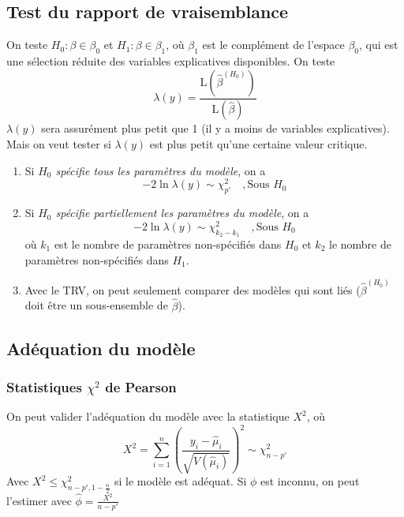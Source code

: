 \documentclass[10pt, french]{article}
\begin{document}
\begin{multicols*}{3}
\subsection*{Test du rapport de vraisemblance}
On teste $H_0 : \beta \in \beta_0$ et $H_1 : \beta \in \beta_1$, où $\beta_1$ est le complément de l'espace $\beta_0$, qui est une sélection réduite des variables explicatives disponibles. On teste
\[\lambda(y) = \frac{\mathrm{L}\left(\hat{\beta}^{(H_0)} \right)}{\mathrm{L}(\hat{\beta})}   \]
$\lambda(y)$ sera assurément plus petit que 1 (il y a moins de variables explicatives). Mais on veut tester si $\lambda(y)$ est plus petit qu'une certaine valeur critique.

\begin{enumerate}[label=\faAngleRight]
\item Si \emph{$H_0$ spécifie tous les paramètres du modèle}, on a
\[-2 \ln \lambda(y) \sim \chi_{p'}^2 \quad , \text{Sous $H_0$}\]
\item Si \emph{$H_0$ spécifie partiellement les paramètres du modèle}, on a
\[-2 \ln \lambda(y) \sim \chi_{k_2 - k_1}^2 \quad , \text{Sous $H_0$}\]
où $k_1$ est le nombre de paramètres non-spécifiés dans $H_0$ et $k_2$ le nombre de paramètres non-spécifiés dans $H_1$.
\item Avec le TRV, on peut seulement comparer des modèles qui sont liés ($\hat{\beta}^{(H_0)}$ doit être un sous-ensemble de $\hat{\beta}$).
\end{enumerate}

\subsection*{Adéquation du modèle}

\subsubsection*{Statistiques $\chi^2$ de Pearson}
On peut valider l'adéquation du modèle avec la statistique $X^2$, où
\[  X^2 = \sum_{i=1}^{n} \left( \frac{y_i -  \hat{\mu}_i}{\sqrt{V(\hat{\mu}_i)}} \right)^2   \sim \chi_{n-p'}^2 \]
Avec $X^2 \leq \chi_{n-p', 1 - \frac{\alpha}{2}}^2$ si le modèle est adéquat. Si $\phi$ est inconnu, on peut l'estimer avec $\hat{\phi} = \frac{X^2}{n-p'}$


\end{multicols*}
\end{document}
